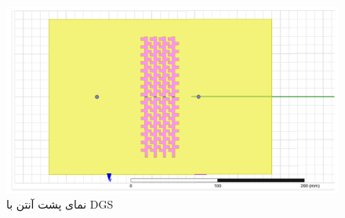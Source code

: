 \begin{figure}
	\centering
	\includegraphics[scale=0.5]{Images/fig39.png}
	\caption{نمای پشت آنتن با DGS}
	\label{fig39}
\end{figure}








